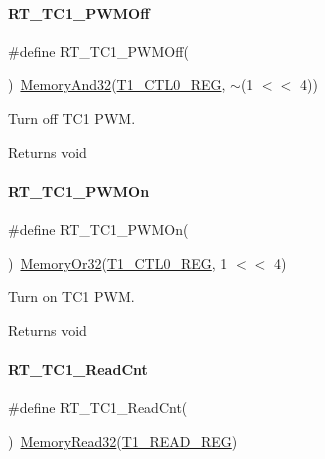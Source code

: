 \paragraph{\texorpdfstring{R\+T\+\_\+\+T\+C1\+\_\+\+P\+W\+M\+Off}{RT\_TC1\_PWMOff}}
{\footnotesize\ttfamily \#define R\+T\+\_\+\+T\+C1\+\_\+\+P\+W\+M\+Off(\begin{DoxyParamCaption}{ }\end{DoxyParamCaption})~\mbox{\hyperlink{a00026_ad87cedffcaadc51db22594fce55173d4}{Memory\+And32}}(\mbox{\hyperlink{a00026_a55600694c3c73a1019f78d306f474fa1}{T1\+\_\+\+C\+T\+L0\+\_\+\+R\+EG}}, $\sim$(1 $<$$<$ 4))}



Turn off T\+C1 P\+WM. 

\begin{DoxyReturn}{Returns}
void 
\end{DoxyReturn}
\mbox{\label{a00080_a66b006ccc7fcf8165e1bed013985b92e}} 
\paragraph{\texorpdfstring{R\+T\+\_\+\+T\+C1\+\_\+\+P\+W\+M\+On}{RT\_TC1\_PWMOn}}
{\footnotesize\ttfamily \#define R\+T\+\_\+\+T\+C1\+\_\+\+P\+W\+M\+On(\begin{DoxyParamCaption}{ }\end{DoxyParamCaption})~\mbox{\hyperlink{a00026_a27874a97deab7cecdde5ddecf466e31e}{Memory\+Or32}}(\mbox{\hyperlink{a00026_a55600694c3c73a1019f78d306f474fa1}{T1\+\_\+\+C\+T\+L0\+\_\+\+R\+EG}}, 1 $<$$<$ 4)}



Turn on T\+C1 P\+WM. 

\begin{DoxyReturn}{Returns}
void 
\end{DoxyReturn}
\mbox{\label{a00080_a98f0ff60ac42d9ca3eef5f7d6e893df2}} 
\paragraph{\texorpdfstring{R\+T\+\_\+\+T\+C1\+\_\+\+Read\+Cnt}{RT\_TC1\_ReadCnt}}
{\footnotesize\ttfamily \#define R\+T\+\_\+\+T\+C1\+\_\+\+Read\+Cnt(\begin{DoxyParamCaption}{ }\end{DoxyParamCaption})~\mbox{\hyperlink{a00026_a2d484dc15bdf30ee11ab3b05f31f0e16}{Memory\+Read32}}(\mbox{\hyperlink{a00026_ac4d488d7f758fa9852def3acfef02dbe}{T1\+\_\+\+R\+E\+A\+D\+\_\+\+R\+EG}})}



